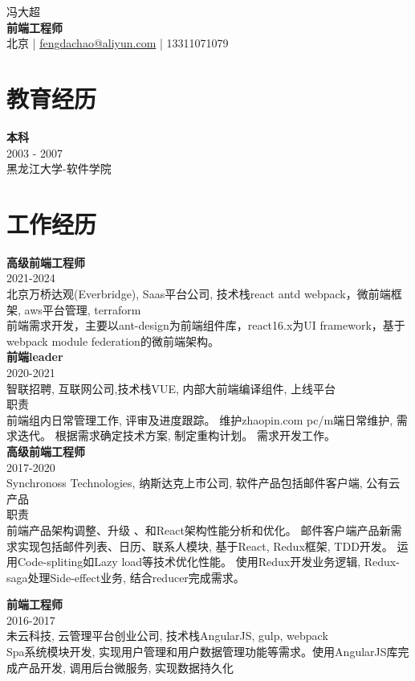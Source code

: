 \documentclass[a4paper,9pt]{extarticle}
\begin{document}
\pagestyle{empty}

\begin{center}
冯大超\\[3pt] %
\textbf{前端工程师}\\[1pt] %
北京 | \href{mailto:fengdachao@aliyun.com}{fengdachao@aliyun.com} | 13311071079 %
\end{center}


\section*{教育经历}
\noindent
\newline
\textbf{本科} \\
2003 - 2007 \\ 
黑龙江大学-软件学院 \\


\section*{工作经历}
\newline
\noindent
\textbf{高级前端工程师} \\
2021-2024 \\
北京万桥达观(Everbridge), Saas平台公司, 技术栈react antd webpack，微前端框架, aws平台管理, terraform\\
前端需求开发，主要以ant-design为前端组件库，react16.x为UI framework，基于webpack module federation的微前端架构。\\

\noindent
\textbf{前端leader} \\
2020-2021 \\
智联招聘, 互联网公司,技术栈VUE, 内部大前端编译组件, 上线平台 \\ 
职责\\
前端组内日常管理工作, 评审及进度跟踪。 维护zhaopin.com pc/m端日常维护, 需求迭代。 根据需求确定技术方案, 制定重构计划。 需求开发工作。 \\ 

\noindent
\textbf{高级前端工程师} \\
2017-2020 \\
Synchronoss Technologies, 纳斯达克上市公司, 软件产品包括邮件客户端, 公有云产品 \\
职责\\
前端产品架构调整、升级 、和React架构性能分析和优化。 邮件客户端产品新需求实现包括邮件列表、日历、联系人模块, 基于React, Redux框架, TDD开发。 运用Code-spliting如Lazy load等技术优化性能。 使用Redux开发业务逻辑, Redux-saga处理Side-effect业务, 结合reducer完成需求。

\noindent
\textbf{前端工程师} \\
2016-2017  \\
未云科技, 云管理平台创业公司, 技术栈AngularJS, gulp, webpack\\
Spa系统模块开发, 实现用户管理和用户数据管理功能等需求。使用AngularJS库完成产品开发, 调用后台微服务, 实现数据持久化 \\


\end{document}

